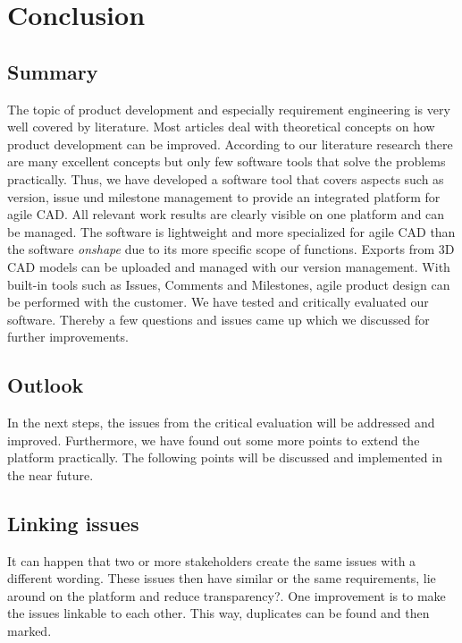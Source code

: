 \section{Conclusion}
\label{sec:conclusion}

\subsection*{Summary}

The topic of product development and especially requirement engineering is very well covered by literature. Most articles deal with theoretical concepts on how product development can be improved. According to our literature research there are many excellent concepts but only few software tools that solve the problems practically. Thus, we have developed a software tool that covers aspects such as version, issue und milestone management to provide an integrated platform for agile CAD. All relevant work results are clearly visible on one platform and can be managed. The software is lightweight and more specialized for agile CAD than the software \textit{onshape} due to its more specific scope of functions. Exports from 3D CAD models can be uploaded and managed with our version management. With built-in tools such as Issues, Comments and Milestones, agile product design can be performed with the customer. We have tested and critically evaluated our software. Thereby a few questions and issues came up which we discussed for further improvements.

\subsection*{Outlook}

In the next steps, the issues from the critical evaluation will be addressed and improved. Furthermore, we have found out some more points to extend the platform practically. The following points will be discussed and implemented in the near future.

\subsection*{Linking issues}

It can happen that two or more stakeholders create the same issues with a different wording. These issues then have similar or the same requirements, lie around on the platform and reduce transparency?. One improvement is to make the issues linkable to each other. This way, duplicates can be found and then marked.

